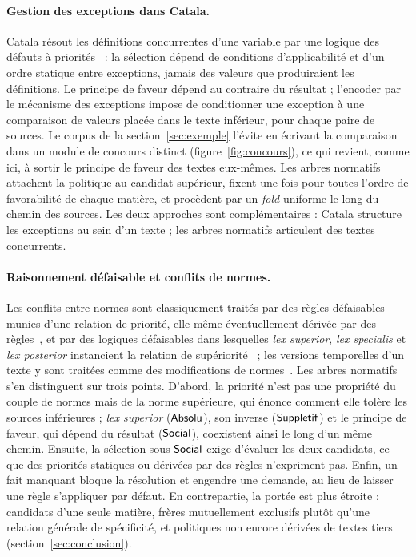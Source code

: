 \documentclass[review]{jflart}
\begin{document}
\paragraph{Gestion des exceptions dans Catala.}
Catala résout les définitions concurrentes d'une variable par une logique des
défauts à priorités~\cite{merigoux2021} : la sélection dépend de conditions
d'applicabilité et d'un ordre statique entre exceptions, jamais des valeurs que
produiraient les définitions. Le principe de faveur dépend au contraire du
résultat ; l'encoder par le mécanisme des exceptions impose de conditionner
une exception à une comparaison de valeurs placée dans le texte inférieur, pour
chaque paire de sources. Le corpus de la section~\ref{sec:exemple} l'évite en
écrivant la comparaison dans un module de concours distinct
(figure~\ref{fig:concours}), ce qui revient, comme ici, à sortir le principe de
faveur des textes eux-mêmes. Les arbres normatifs attachent la politique au candidat supérieur,
fixent une fois pour toutes l'ordre de favorabilité de chaque matière, et
procèdent par un \emph{fold} uniforme le long du chemin des sources. Les deux
approches sont complémentaires : Catala structure les exceptions au sein d'un
texte ; les arbres normatifs articulent des textes concurrents.

\paragraph{Raisonnement défaisable et conflits de normes.}
Les conflits entre normes sont classiquement traités par des règles
défaisables munies d'une relation de priorité, elle-même éventuellement
dérivée par des règles~\cite{prakkensartor1996,prakkensartor1997}, et par des
logiques défaisables dans lesquelles \emph{lex superior}, \emph{lex specialis}
et \emph{lex posterior} instancient la relation de
supériorité~\cite{governatori2021} ; les versions temporelles d'un texte y sont
traitées comme des modifications de normes~\cite{governatori2005}. Les arbres
normatifs s'en distinguent sur trois points. D'abord, la priorité n'est pas une
propriété du couple de normes mais de la norme supérieure, qui énonce comment
elle tolère les sources inférieures ; \emph{lex superior} (\(\mathsf{Absolu}\)), son
inverse (\(\mathsf{Suppletif}\)) et le principe de faveur, qui dépend du résultat
(\(\mathsf{Social}\)), coexistent ainsi le long d'un même chemin. Ensuite, la sélection
sous \(\mathsf{Social}\) exige d'évaluer les deux candidats, ce que des priorités
statiques ou dérivées par des règles n'expriment pas. Enfin, un fait manquant
bloque la résolution et engendre une demande, au lieu de laisser une règle
s'appliquer par défaut. En contrepartie, la portée est plus étroite : candidats
d'une seule matière, frères mutuellement exclusifs plutôt qu'une relation
générale de spécificité, et politiques non encore dérivées de textes tiers
(section~\ref{sec:conclusion}).
\end{document}
